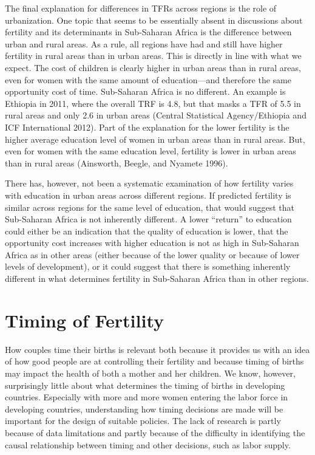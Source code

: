 \documentclass[]{article}
\begin{document}
The final explanation for differences in TFRs across regions is the role of urbanization. One topic that seems to be essentially absent in discussions about fertility and its determinants in Sub-Saharan Africa is the difference between urban and rural areas. As a rule, all regions have had and still have higher fertility in rural areas than in urban areas. This is directly in line with what we expect. The cost of children is clearly higher in urban areas than in rural areas, even for women with the same amount of education---and therefore the same opportunity cost of time. Sub-Saharan Africa is no different. An example is Ethiopia in 2011, where the overall TRF is 4.8, but that masks a TFR of 5.5 in rural areas and only 2.6 in urban areas (Central Statistical Agency/Ethiopia and ICF International 2012). Part of the explanation for the lower fertility is the higher average education level of women in urban areas than in rural areas. But, even for women with the same education level, fertility is lower in urban areas than in rural areas (Ainsworth, Beegle, and Nyamete 1996).

There has, however, not been a systematic examination of how fertility varies with education in urban areas across different regions. If predicted fertility is similar across regions for the same level of education, that would suggest that Sub-Saharan Africa is not inherently different. A lower ``return'' to education could either be an indication that the quality of education is lower, that the opportunity cost increases with higher education is not as high in Sub-Saharan Africa as in other areas (either because of the lower quality or because of lower levels of development), or it could suggest that there is something inherently different in what determines fertility in Sub-Saharan Africa than in other regions.

\section{Timing of Fertility}\label{timing-of-fertility}

How couples time their births is relevant both because it provides us with an idea of how good people are at controlling their fertility and because timing of births may impact the health of both a mother and her children. We know, however, surprisingly little about what determines the timing of births in developing countries. Especially with more and more women entering the labor force in developing countries, understanding how timing decisions are made will be important for the design of suitable policies. The lack of research is partly because of data limitations and partly because of the difficulty in identifying the causal relationship between timing and other decisions, such as labor supply.
\end{document}
